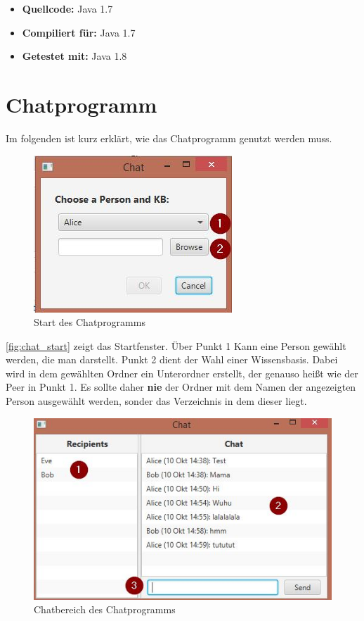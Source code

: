 \documentclass[a4paper]{article}
\begin{document}
\begin{appendix}
	\begin{itemize}
		\item \textbf{Quellcode:} Java 1.7
		\item \textbf{Compiliert für:} Java 1.7
		\item \textbf{Getestet mit:} Java 1.8
	\end{itemize} 
	
	\newpage
	\section{Chatprogramm}
	\label{sec:chatprogramm}
	
	Im folgenden ist kurz erklärt, wie das Chatprogramm genutzt werden muss.
	
	\begin{figure}[H]
		\centerline{
			\includegraphics{../Bilder/chat_start.jpg}
		}
		\caption{Start des Chatprogramms}
		\label{fig:chat_start}
	\end{figure}	
	
	\autoref{fig:chat_start} zeigt das Startfenster.
	Über Punkt 1 Kann eine Person gewählt werden, die man darstellt. Punkt
	2 dient der Wahl einer Wissensbasis. Dabei wird in dem gewählten Ordner
	ein Unterordner erstellt, der genauso heißt wie der Peer in Punkt 1. Es
	sollte daher \textbf{nie} der Ordner mit dem Namen der angezeigten Person
	ausgewählt werden, sonder das Verzeichnis in dem dieser liegt.
		
	\begin{figure}[H]
		\centerline{
			\includegraphics[scale=0.75]{../Bilder/chat_chat.jpg}
		}
		\caption{Chatbereich des Chatprogramms}
		\label{fig:chat_chat}
	\end{figure}	
	

\end{appendix}
\end{document}
